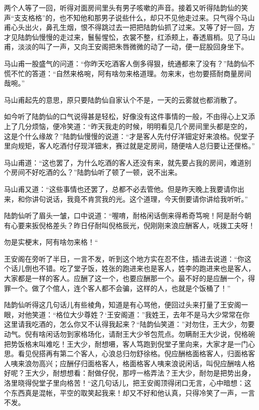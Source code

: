 \documentclass[12pt,UTF8]{ctexbook}
\begin{document}
{{{两个人等了一回，听得对面房间里头有男子咳嗽的声音。接着又听得陆韵仙的笑声“支支格格”的，也不知他和那男子说些什么，却只不见他走过来。只气得个马山甫心头出火，鼻孔生烟，恨不得跳过去一把把陆韵仙抓了过来。又等了好一回，方才见陆韵仙慢慢的走过来，鬟髻惺忪，衣裳不整，红添颊上，春透眉梢。见了马山甫，淡淡的叫了一声，又向王安阁把朱唇微微的动了一动，便一屁股回身坐下。

马山甫一股盛气的问道：“你昨天吃酒客人倒多得狠，统通都来了没有？”陆韵仙不慌不忙的答道：“自然来格啘，阿有啥勿来格道理。勿来末，也勿要搭耐商量房间哉啘。”

马山甫起先的意思，原只要陆韵仙自家认个不是，一天的云雾就也都消散了。

如今听了陆韵仙的口气说得甚是轻松，好像没有这件事情的一般，不由得心上又添上了几分烦恼，便冷笑道：“昨天我走的时候，明明看见几个房间里头都是空的，这是个什么缘故？”陆韵仙慢慢的说道：“才是客人先付仔洋钿定好来浪格。倪堂子里向规矩，客人吃酒付仔现洋钿末，赛过就是定房间，随便啥人总归要让还俚格。”

马山甫道：“这也罢了，为什么吃酒的客人还没有来，就先要占我的房间，难道别个房间不好吃酒的么？”陆韵仙听了顿了一顿，说不出来。

马山甫又道：“这些事情也还罢了，总都不必去管他。但是昨天晚上我要请你出来，和你讲句说话，我竟不肯赏我的光。这个道理，今天倒要请你讲给我听听。”

陆韵仙听了眉头一皱，口中说道：“喔唷，耐格闲话倒来得希奇笃啘！阿是耐今朝有心要来扳倪格差头？昨日仔耐叫倪格辰光，倪刚刚来浪应酬客人，呒拨工夫呀！

勿是实梗末，阿有啥勿来格！“

王安阁在旁听了半日，一言不发，听到这个地方实在忍不住，插进去说道：“你这个话儿倒也不错。吃了堂子饭，姓张的跑进来也是客人，姓李的跑进来也是客人，大家都是一样的客人。应酬了这一个，也要应酬那一个。最不好的是应酬一个，得罪一个。做了个倌人，连个客人都不会骗，这样的人，也就是个饭桶了！”

陆韵仙听得这几句话儿有些棱角，知道是有心骂他，便回过头来打量了王安阁一眼，对他笑道：“格位大少尊姓？‘王安阁道：”我姓王，去年不是马大少常常在你这里请我吃酒的，怎么你又不认得我起来？“陆韵仙笑道：”对勿住，王大少，勿要动气。倪有啥闲话勿到家格场化，请耐王大少爷包荒点。勿瞒耐王大少说，倪格碗把势饭格末叫难吃！王大少，耐想嗫，客人笃跑到倪堂子里向来，大家才是一门心思。看见倪搭再有第二个客人，心浪总归勿舒徐格。倪应酬格面格客人，归面格客人咦来浪勿高兴；应酬仔归面格客人，格面格客人咦来浪说闲话，叫倪应酬啥人格好呢？王大少，耐想想看：耐做仔倪，那哼一格弄法？王大少，耐勿是把势出身，洛里晓得倪堂子里向格苦！“这几句话儿，把王安阁顶得闭口无言，心中暗想：这个东西真是混帐，平空的取笑起我来！却又不好和他认真，只得冷笑了一声，一言不发。

}}}
\end{document}

